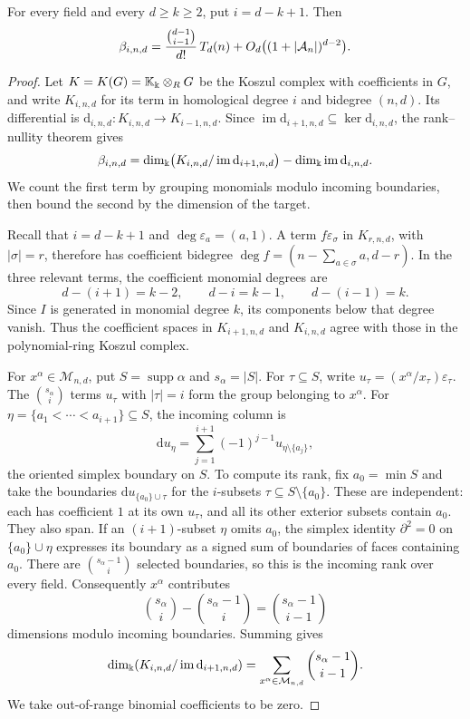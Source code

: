\begin{theorem}
\label{thm:fixed-weight-betti-euler}
For every field and every $d\ge k\ge2$, put $i=d-k+1$. Then
\begin{equation}\label{eq:fixed-weight-leading}
 \beta_{i,n,d}
 =\frac{\binom{d-1}{i-1}}{d!}\,T_d(n)
      +O_d\bigl((1+|\mathcal A_n|)^{d-2}\bigr).
\end{equation}
\end{theorem}
\begin{proof}
Let $K=K(G)=\mathbb K_\Bbbk\otimes_R G$ be the Koszul complex with
coefficients in $G$, and write $K_{i,n,d}$ for its term in homological
degree $i$ and bidegree $(n,d)$. Its differential is
$\mathrm d_{i,n,d}:K_{i,n,d}\to K_{i-1,n,d}$.
Since $\operatorname{im}\mathrm d_{i+1,n,d}\subseteq\ker\mathrm d_{i,n,d}$,
the rank--nullity theorem gives
\begin{equation}\label{eq:koszul-rank-nullity}
 \beta_{i,n,d}
 =\dim_\Bbbk\bigl(K_{i,n,d}/\operatorname{im}\mathrm d_{i+1,n,d}\bigr)
  -\dim_\Bbbk\operatorname{im}\mathrm d_{i,n,d}.
\end{equation}
We count the first term by grouping monomials modulo incoming
boundaries, then bound the second by the dimension of the target.

Recall that $i=d-k+1$ and $\deg\varepsilon_a=(a,1)$.
A term $f\varepsilon_\sigma$ in $K_{r,n,d}$, with $|\sigma|=r$,
therefore has coefficient bidegree
$\deg f=(n-\sum_{a\in\sigma}a,d-r)$. In the three relevant terms,
the coefficient monomial degrees are
\[
 d-(i+1)=k-2,\qquad d-i=k-1,\qquad d-(i-1)=k.
\]
Since $I$ is generated in monomial degree $k$, its components below
that degree vanish. Thus the coefficient spaces in $K_{i+1,n,d}$
and $K_{i,n,d}$ agree with those in the polynomial-ring Koszul complex.

For $x^\alpha\in\mathcal M_{n,d}$, put
$S=\operatorname{supp}\alpha$ and $s_\alpha=|S|$. For $\tau\subseteq S$,
write $u_\tau=(x^\alpha/x_\tau)\varepsilon_\tau$.
The $\binom{s_\alpha}{i}$ terms $u_\tau$ with $|\tau|=i$ form the
group belonging to $x^\alpha$. For
$\eta=\{a_1<\cdots<a_{i+1}\}\subseteq S$, the incoming column is
\[
 \mathrm d u_\eta
   =\sum_{j=1}^{i+1}(-1)^{j-1}u_{\eta\setminus\{a_j\}},
\]
the oriented simplex boundary on $S$.
To compute its rank, fix $a_0=\min S$ and take the boundaries
$\mathrm d u_{\{a_0\}\cup\tau}$ for the $i$-subsets
$\tau\subseteq S\setminus\{a_0\}$. These are independent:
each has coefficient $1$ at its own $u_\tau$, and all its other
exterior subsets contain $a_0$. They also span. If an $(i+1)$-subset $\eta$
omits $a_0$, the simplex identity $\partial^2=0$ on
$\{a_0\}\cup\eta$ expresses its boundary as a signed sum of
boundaries of faces containing $a_0$.
There are $\binom{s_\alpha-1}{i}$ selected boundaries, so this is
the incoming rank over every field. Consequently $x^\alpha$ contributes
\[
 \binom{s_\alpha}{i}-\binom{s_\alpha-1}{i}
   =\binom{s_\alpha-1}{i-1}
\]
dimensions modulo incoming boundaries. Summing gives
\[
 \dim_\Bbbk(K_{i,n,d}/\operatorname{im}\mathrm{d}_{i+1,n,d})
   =\sum_{x^\alpha\in\mathcal M_{n,d}}
             \binom{s_\alpha-1}{i-1}.
\]
We take out-of-range binomial coefficients to be zero.


\end{proof}
